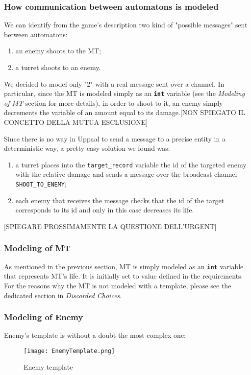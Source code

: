 \documentclass[
10pt, %
a4paper, %
oneside, %
headinclude,footinclude, %
BCOR5mm, %
]{scrartcl}
\begin{document}
	\subsubsection{How communication between automatons is modeled}
	We can identify from the game's description two kind of "possible messages" sent between automatons:
	\begin{enumerate}
		\item an enemy shoots to the MT;
		\item a turret shoots to an enemy.
	\end{enumerate}
	We decided to model only "2" with a real message sent over a channel. In particular, since the MT is modeled simply as an \texttt{\textbf{int}} variable (see the \emph{Modeling of MT} section for more details), in order to shoot to it, an enemy simply decrements the variable of an amount equal to its damage.[NON SPIEGATO IL CONCETTO DELLA MUTUA ESCLUSIONE]
	
	Since there is no way in Uppaal to send a message to a precise entity in a deterministic way, a pretty easy solution we found was:
	\begin{enumerate}
		\item a turret places into the \texttt{target\_record} variable the id of the targeted enemy with the relative damage and sends a message over the broadcast channel \texttt{SHOOT\_TO\_ENEMY};
		\item each enemy that receives the message checks that the id of the target corresponds to its id and only in this case decreases its life.
	\end{enumerate}
	[SPIEGARE PROSSIMAMENTE LA QUESTIONE DELL'URGENT]
	
	\subsubsection{Modeling of MT}
	As mentioned in the previous section, MT is simply modeled as an \texttt{\textbf{int}} variable that represents MT's life. It is initially set to value defined in the requirements. For the reasons why the MT is not modeled with a template, please see the dedicated section in \emph{Discarded Choices}.
	
	\subsubsection{Modeling of Enemy}
	Enemy's template is without a doubt the most complex one:
	
	\begin{figure}[h!]
		\centering
		\texttt{[image: EnemyTemplate.png]}
		\caption{Enemy template}
	\end{figure}
	
\end{document}
